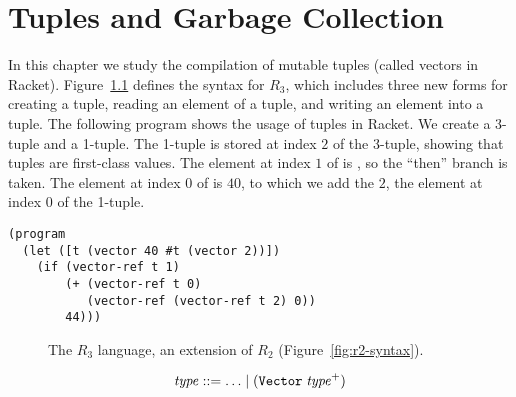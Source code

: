 \documentclass[11pt]{book}
\begin{document}
\chapter{Tuples and Garbage Collection}
\label{ch:tuples}

In this chapter we study the compilation of mutable tuples (called
vectors in Racket). Figure~\ref{fig:r3-syntax} defines the syntax for
$R_3$, which includes three new forms for creating a tuple, reading an
element of a tuple, and writing an element into a tuple. The following
program shows the usage of tuples in Racket. We create a 3-tuple
 and a 1-tuple. The 1-tuple is stored at index $2$ of the
3-tuple, showing that tuples are first-class values.  The element at
index $1$ of  is , so the ``then'' branch is taken.
The element at index $0$ of  is $40$, to which we add the $2$,
the element at index $0$ of the 1-tuple.
\begin{lstlisting}
(program
  (let ([t (vector 40 #t (vector 2))])
    (if (vector-ref t 1)
        (+ (vector-ref t 0)
           (vector-ref (vector-ref t 2) 0))
        44)))
\end{lstlisting}


\begin{figure}[tbp]
\centering
{}
\caption{The $R_3$ language, an extension of $R_2$
  (Figure~\ref{fig:r2-syntax}).}
\label{fig:r3-syntax}
\end{figure}

\[
  \mathit{type} ::= \ldots \mid (\texttt{Vector}\;\mathit{type}^{+}) 
\]
\end{document}
